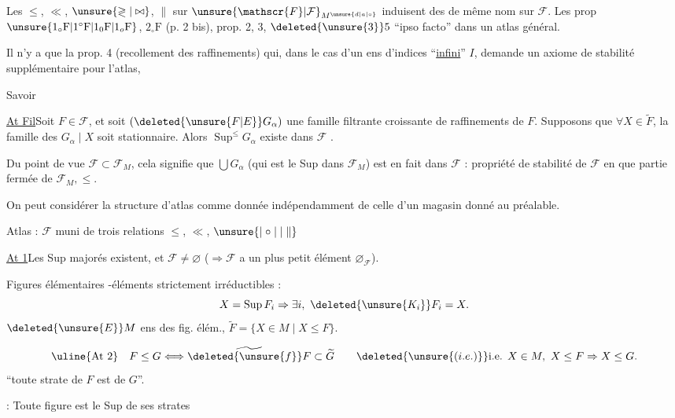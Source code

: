 Les  $\leq$, $\ll$, $\unsure{\gtrless|\bowtie}$, $\parallel$ sur $\unsure{\mathscr{F}|\mathcal{F}}_{M^{\unsure{d|a|\circ}}}$ induisent des \deleted{$\unsure{\Rightarrow}$} de même nom sur $\mathscr{F}$.
Les prop $\unsure{1_{\circ}\mathrm{F}|1^{\circ}\mathrm{F}|1_0\mathrm{F}|1_o\mathrm{F}}$, $2_{\circ}\mathrm{F}$ (p. 2 bis), prop. 2, 3, $\deleted{\unsure{3}}5$  ``ipso facto''  dans un atlas général.

Il n'y a que la prop. 4 (recollement des raffinements) qui, dans le cas d'un ens d'indices ``\uline{infini}'' $I$, demande un axiome de stabilité supplémentaire pour l'atlas,

Savoir\par
\uline{At Fil}\quad Soit $F\in\mathscr{F}$, et soit $(\deleted{\unsure{F|E}}G_\alpha)$ une famille filtrante croissante  de raffinements de $F$. Supposons que $\forall X\in\widetilde{F}$, la famille des $G_\alpha\mid X$ soit stationnaire. Alors  $\operatorname{Sup}^{\leq}G_\alpha$ existe dans $\mathscr{F}$  .

Du point de vue $\mathscr{F}\subset\mathscr{F}_M$, cela signifie que $\bigcup G_\alpha$ (qui est le Sup dans $\mathscr{F}_M$) est en fait dans $\mathscr{F}$ : propriété de stabilité de $\mathscr{F}$ en  que partie fermée de $\mathscr{F}_M,\leq$.

On peut considérer la structure d'atlas comme donnée indépendamment de celle d'un magasin donné au préalable.

Atlas : $\mathscr{F}$ muni de trois relations $\leq$, $\ll$, $\unsure{\mid\circ\mid|\parallel}$

\uline{At 1}\quad Les Sup majorés existent, et $\mathscr{F}\neq\varnothing$ ($\Rightarrow\mathscr{F}$ a un plus petit élément $\varnothing_{\mathscr{F}}$).

 Figures élémentaires \unsure{$\cup$|$\vee$}-éléments strictement irréductibles :
\[
X=\operatorname{Sup}F_i\Rightarrow\exists i,\ \deleted{\unsure{K_i}}F_i=X.
\]
$\deleted{\unsure{E}}M$ ens des fig. élém., $\widetilde{F}=\{X\in M\mid X\leq F\}$.

\[
\text{\uline{At 2}}\quad F\leq G\Longleftrightarrow\widetilde{\deleted{\unsure{f}}F}\subset\widetilde{G}\qquad\deleted{\unsure{(i.e.)}}\text{i.e. }X\in M,\ X\leq F\Rightarrow X\leq G.
\]
``toute strate de $F$ est  de $G$''.

 : Toute figure est le Sup de ses strates
